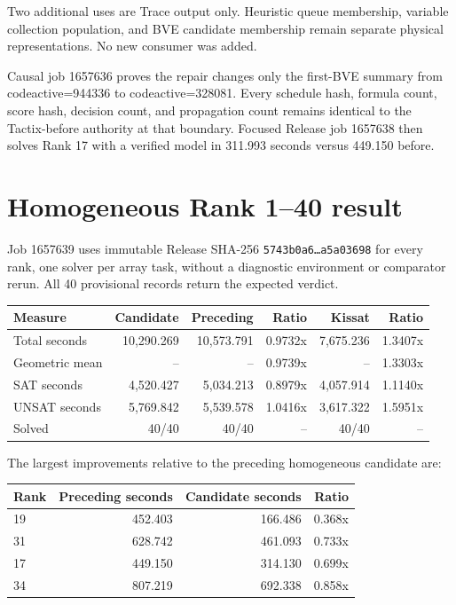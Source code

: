 \documentclass[11pt]{article}
\newcommand{\code}[1]{\texttt{#1}}
\begin{document}
Two additional uses are Trace output only.  Heuristic queue membership,
variable collection population, and BVE candidate membership remain separate
physical representations.  No new consumer was added.

Causal job 1657636 proves the repair changes only the first-BVE summary from
code{active=944336} to code{active=328081}.  Every schedule hash, formula
count, score hash, decision count, and propagation count remains identical to
the Tactix-before authority at that boundary.  Focused Release job 1657638 then
solves Rank 17 with a verified model in 311.993 seconds versus 449.150 before.

\section{Homogeneous Rank 1--40 result}

Job 1657639 uses immutable Release SHA-256
\code{5743b0a6\ldots a5a03698} for every rank, one solver per array task,
without a diagnostic environment or comparator rerun.  All 40 provisional
records return the expected verdict.

\begin{center}
\begin{tabular}{lrrrrr}
\toprule
Measure & Candidate & Preceding & Ratio & Kissat & Ratio \\
\midrule
Total seconds & 10,290.269 & 10,573.791 & 0.9732x & 7,675.236 & 1.3407x \\
Geometric mean & -- & -- & 0.9739x & -- & 1.3303x \\
SAT seconds & 4,520.427 & 5,034.213 & 0.8979x & 4,057.914 & 1.1140x \\
UNSAT seconds & 5,769.842 & 5,539.578 & 1.0416x & 3,617.322 & 1.5951x \\
Solved & 40/40 & 40/40 & -- & 40/40 & -- \\
\bottomrule
\end{tabular}
\end{center}

The largest improvements relative to the preceding homogeneous candidate are:

\begin{center}
\begin{tabular}{lrrr}
\toprule
Rank & Preceding seconds & Candidate seconds & Ratio \\
\midrule
19 & 452.403 & 166.486 & 0.368x \\
31 & 628.742 & 461.093 & 0.733x \\
17 & 449.150 & 314.130 & 0.699x \\
34 & 807.219 & 692.338 & 0.858x \\
\bottomrule
\end{tabular}
\end{center}
\end{document}
